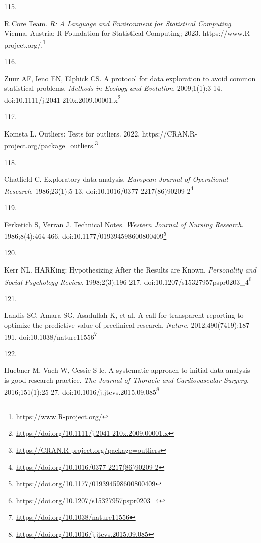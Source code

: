 \documentclass[
  a4paper,
]{book}
\newlength{\cslhangindent}
\newlength{\csllabelwidth}
\newlength{\cslentryspacingunit} %
\newenvironment{CSLReferences}[2] %
 {%
  \setlength{\parindent}{0pt}
  \ifodd #1
  \let\oldpar\par
  \def\par{\hangindent=\cslhangindent\oldpar}
  \fi
  \setlength{\parskip}{#2\cslentryspacingunit}
 }%
 {}
\newcommand{\CSLLeftMargin}[1]{\parbox[t]{\csllabelwidth}{#1}}
\newcommand{\CSLRightInline}[1]{\parbox[t]{\linewidth - \csllabelwidth}{#1}\break}
\renewcommand{\href}[2]{#2\footnote{\url{#1}}}
\begin{document}
\begin{CSLReferences}{0}{0}
\leavevmode{}%
\CSLLeftMargin{115. }%
\CSLRightInline{R Core Team. \emph{{R}: A Language and Environment for Statistical Computing}. Vienna, Austria: R Foundation for Statistical Computing; 2023. \href{https://www.R-project.org/}{https://www.R-project.org/.}}

\leavevmode{}%
\CSLLeftMargin{116. }%
\CSLRightInline{Zuur AF, Ieno EN, Elphick CS. A protocol for data exploration to avoid common statistical problems. \emph{Methods in Ecology and Evolution}. 2009;1(1):3-14. doi:\href{https://doi.org/10.1111/j.2041-210x.2009.00001.x}{10.1111/j.2041-210x.2009.00001.x}}

\leavevmode{}%
\CSLLeftMargin{117. }%
\CSLRightInline{Komsta L. Outliers: Tests for outliers. 2022. \href{https://CRAN.R-project.org/package=outliers}{https://CRAN.R-project.org/package=outliers.}}

\leavevmode{}%
\CSLLeftMargin{118. }%
\CSLRightInline{Chatfield C. Exploratory data analysis. \emph{European Journal of Operational Research}. 1986;23(1):5-13. doi:\href{https://doi.org/10.1016/0377-2217(86)90209-2}{10.1016/0377-2217(86)90209-2}}

\leavevmode{}%
\CSLLeftMargin{119. }%
\CSLRightInline{Ferketich S, Verran J. Technical Notes. \emph{Western Journal of Nursing Research}. 1986;8(4):464-466. doi:\href{https://doi.org/10.1177/019394598600800409}{10.1177/019394598600800409}}

\leavevmode{}%
\CSLLeftMargin{120. }%
\CSLRightInline{Kerr NL. HARKing: Hypothesizing After the Results are Known. \emph{Personality and Social Psychology Review}. 1998;2(3):196-217. doi:\href{https://doi.org/10.1207/s15327957pspr0203_4}{10.1207/s15327957pspr0203\_4}}

\leavevmode{}%
\CSLLeftMargin{121. }%
\CSLRightInline{Landis SC, Amara SG, Asadullah K, et al. A call for transparent reporting to optimize the predictive value of preclinical research. \emph{Nature}. 2012;490(7419):187-191. doi:\href{https://doi.org/10.1038/nature11556}{10.1038/nature11556}}

\leavevmode{}%
\CSLLeftMargin{122. }%
\CSLRightInline{Huebner M, Vach W, Cessie S le. A systematic approach to initial data analysis is good research practice. \emph{The Journal of Thoracic and Cardiovascular Surgery}. 2016;151(1):25-27. doi:\href{https://doi.org/10.1016/j.jtcvs.2015.09.085}{10.1016/j.jtcvs.2015.09.085}}


\end{CSLReferences}
\end{document}
